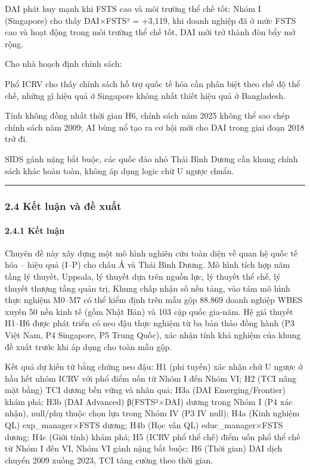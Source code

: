 \documentclass[
  a4paper,
  13pt]{extreport}
\begin{document}
DAI phát huy mạnh khi FSTS cao và môi trường thể chế tốt: Nhóm I
(Singapore) cho thấy DAI×FSTS² = +3,119, khi doanh nghiệp đã ở mức FSTS
cao và hoạt động trong môi trường thể chế tốt, DAI mới trở thành đòn bẩy
mở rộng.

Cho nhà hoạch định chính sách:

Phổ ICRV cho thấy chính sách hỗ trợ quốc tế hóa cần phân biệt theo chế
độ thể chế, những gì hiệu quả ở Singapore không nhất thiết hiệu quả ở
Bangladesh.

Tính không đồng nhất thời gian H6, chính sách năm 2025 không thể sao
chép chính sách năm 2009; AI bùng nổ tạo ra cơ hội mới cho DAI trong
giai đoạn 2018 trở đi.

SIDS gánh nặng bắt buộc, các quốc đảo nhỏ Thái Bình Dương cần khung
chính sách khác hoàn toàn, không áp dụng logic chữ U ngược chuẩn.

\begin{center}\rule{0.5\linewidth}{0.5pt}\end{center}

\hypertarget{kux1ebft-luux1eadn-vuxe0-ux111ux1ec1-xuux1ea5t}{%
\subsubsection{2.4 Kết luận và đề
xuất}\label{kux1ebft-luux1eadn-vuxe0-ux111ux1ec1-xuux1ea5t}}

\hypertarget{kux1ebft-luux1eadn}{%
\paragraph{2.4.1 Kết luận}\label{kux1ebft-luux1eadn}}

Chuyên đề này xây dựng một mô hình nghiên cứu toàn diện về quan hệ quốc
tế hóa -- hiệu quả (I--P) cho châu Á và Thái Bình Dương. Mô hình tích
hợp năm tầng lý thuyết, Uppsala, lý thuyết dựa trên nguồn lực, lý thuyết
thể chế, lý thuyết thượng tầng quản trị, Khung chấp nhận số nền tảng,
vào tám mô hình thực nghiệm M0--M7 có thể kiểm định trên mẫu gộp 88.869
doanh nghiệp WBES xuyên 50 nền kinh tế (gồm Nhật Bản) và 103 cặp quốc
gia-năm. Hệ giả thuyết H1--H6 được phát triển có neo đậu thực nghiệm từ
ba bản thảo đồng hành (P3 Việt Nam, P4 Singapore, P5 Trung Quốc), xác
nhận tính khả nghiệm của khung đề xuất trước khi áp dụng cho toàn mẫu
gộp.

Kết quả dự kiến từ bằng chứng neo đậu: H1 (phi tuyến) xác nhận chữ U
ngược ở hầu hết nhóm ICRV với phổ điểm uốn từ Nhóm I đến Nhóm VI; H2
(TCI nâng mặt bằng) TCI dương bền vững và nhân quả; H3a (DAI
Emerging/Frontier) khám phá; H3b (DAI Advanced) β(FSTS²×DAI) dương trong
Nhóm I (P4 xác nhận), null/phụ thuộc chọn lựa trong Nhóm IV (P3 IV
null); H4a (Kinh nghiệm QL) exp\_manager×FSTS dương; H4b (Học vấn QL)
educ\_manager×FSTS dương; H4c (Giới tính) khám phá; H5 (ICRV phổ thể
chế) điểm uốn phổ thể chế từ Nhóm I đến VI, Nhóm VI gánh nặng bắt buộc;
H6 (Thời gian) DAI dịch chuyển 2009 xuống 2023, TCI tăng cường theo thời
gian.
\end{document}
